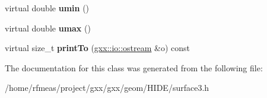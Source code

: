 \begin{DoxyCompactItemize}
\item 
virtual double {\bfseries umin} ()\hypertarget{classgxx_1_1surf3_1_1surface_a99c0da12133c655bd16f7c97a75055a3}{}\label{classgxx_1_1surf3_1_1surface_a99c0da12133c655bd16f7c97a75055a3}

\item 
virtual double {\bfseries umax} ()\hypertarget{classgxx_1_1surf3_1_1surface_a62bb9562be8568271bf7fe2c1afda3dc}{}\label{classgxx_1_1surf3_1_1surface_a62bb9562be8568271bf7fe2c1afda3dc}

\item 
virtual size\+\_\+t {\bfseries print\+To} (\hyperlink{classgxx_1_1io_1_1ostream}{gxx\+::io\+::ostream} \&o) const \hypertarget{classgxx_1_1surf3_1_1surface_aad144d13fbc5f54e7de7fe93df88904a}{}\label{classgxx_1_1surf3_1_1surface_aad144d13fbc5f54e7de7fe93df88904a}

\end{DoxyCompactItemize}


The documentation for this class was generated from the following file\+:\begin{DoxyCompactItemize}
\item 
/home/rfmeas/project/gxx/gxx/geom/\+H\+I\+D\+E/surface3.\+h\end{DoxyCompactItemize}
